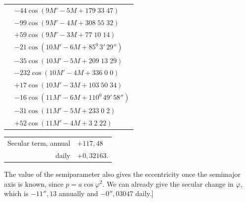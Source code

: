 \begin{landscape}
\begin{longtable}{@{}r@{}l@{}}
&\(-44\cos(9M'-5M+179\;33\;47)\)\\
&\(-99\cos(9M'-4M+308\;55\;32)\)\\
&\(+59\cos(9M'-3M+77\;10\;14)\)\\[3pt]
&\(-21\cos(10M'-6M+85^0\,3'\,29'')\)\\
&\(-35\cos(10M'-5M+209\;13\;29)\)\\
&\(-232\cos(10M'-4M+336\;0\;0)\)\\
&\(+17\cos(10M'-3M+103\;50\;34)\)\\[3pt]
&\(-16\cos(11M'-6M+110^0\,49'\,58'')\)\\
&\(-31\cos(11M'-5M+233\;0\;2)\)\\
&\(+52\cos(11M'-4M+3\;2\;22)\)
\end{longtable}
\begin{center}
\begin{tabular}{rl}
Secular term, annual&\(+117{,}48\)\\
daily&\(+0{,}32163\).
\end{tabular}
\end{center}
\endgroup
\par\noindent\hspace*{\parindent}The value of the semiparameter also gives the eccentricity once the semimajor axis is known, since \(p=a\cos\varphi^2\). We can already give the secular change in \(\varphi\), which is \(-11''{,}13\) annually and \(-0''{,}03047\) daily.]
\clearpage
\endgroup
\end{landscape}
